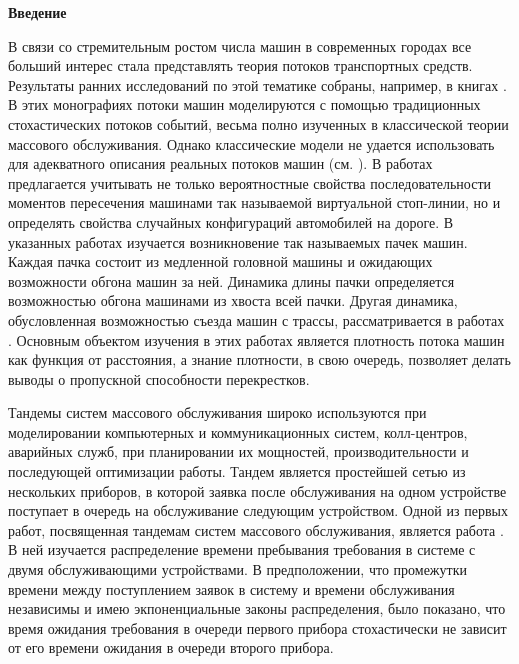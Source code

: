 \documentclass[a4paper,twoside]{article}
\newcommand{\firstheader}[1]{\noindent\textbf{#1}\nopagebreak\bigskip}
\theoremstyle{theorem}
\theoremstyle{remark}
\begin{document}

\firstheader{Введение}

В связи со стремительным ростом числа машин в современных городах все больший интерес стала представлять теория потоков транспортных средств. Результаты ранних исследований по этой тематике собраны, например, в книгах \cite{Haight:1963, Drew:1968, Inose:1975}. В этих монографиях потоки машин моделируются с помощью традиционных стохастических потоков событий, весьма полно изученных в классической теории массового обслуживания. Однако классические модели не удается использовать для адекватного описания реальных потоков машин (см. \cite{Bartlet:1963, Cox:1969,Dshalalov:1997}). В работах
\cite{Fedotkin:Kudryavcev:Rachinskaya:2010, Rachinskaya:Fedotkin:2011:1, Rachinskaya:Fedotkin:2014} предлагается учитывать не только вероятностные свойства последовательности моментов пересечения машинами так называемой виртуальной стоп-линии, но и определять свойства случайных конфигураций автомобилей на дороге. В указанных работах изучается возникновение так называемых пачек машин. Каждая пачка состоит из медленной головной машины и ожидающих возможности обгона машин за ней. Динамика длины пачки определяется возможностью обгона машинами из хвоста всей пачки. Другая динамика, обусловленная возможностью съезда машин с трассы, рассматривается в работах \cite{Afanasyeva:Bulinskaya:2013:1,Afanasyeva:Bulinskaya:2010,Afanasyeva:Bulinskaya:2013:2}. Основным объектом изучения в этих работах является плотность потока машин как функция от расстояния, а знание плотности, в свою очередь, позволяет делать выводы о пропускной способности перекрестков.

Тандемы систем массового обслуживания широко используются при моделировании компьютерных и коммуникационных систем, колл-центров, аварийных служб, при планировании их мощностей, производительности и последующей оптимизации работы. 
Тандем является простейшей сетью из нескольких приборов, в которой заявка после обслуживания на одном устройстве  поступает в очередь на обслуживание следующим устройством.
Одной из первых работ, посвященная тандемам систем массового обслуживания, является работа \cite{Reich:1957}. В ней изучается распределение времени пребывания требования в системе с двумя обслуживающими устройствами. В предположении, что промежутки времени между поступлением заявок в систему и времени обслуживания независимы и имею экпоненциальные законы распределения, было показано, что время ожидания требования в очереди первого прибора стохастически не зависит от его времени ожидания в очереди второго прибора. 
\end{document}
